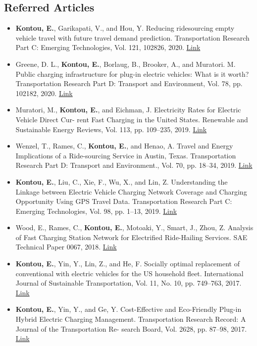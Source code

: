 \documentclass[margin,line]{resume}
\begin{document}
\begin{resume}
   \subsection{\mysidestyle \bf Referred Articles}
\begin{itemize}
\item {\bf Kontou, E.}, Garikapati, V., and Hou, Y. Reducing ridesourcing empty vehicle travel with future travel demand prediction. Transportation Research Part C: Emerging Technologies, Vol. 121, 102826, 2020. \href{https://doi.org/10.1016/j.trc.2020.102826}{Link}
\item Greene, D. L., {\bf Kontou, E.}, Borlaug, B., Brooker, A., and Muratori. M. Public charging infrastructure for plug-in electric vehicles: What is it worth? Transportation Research Part D: Transport and Environment, Vol. 78, pp. 102182, 2020. \href{https://doi.org/10.1016/j.trd. 2019.11.011}{Link}
\item Muratori, M., {\bf Kontou, E.}, and Eichman, J. Electricity Rates for Electric Vehicle Direct Cur- rent Fast Charging in the United States. Renewable and Sustainable Energy Reviews, Vol. 113, pp. 109–235, 2019. \href{https://doi.org/10.1016/j.rser.2019.06.042}{Link}
\item Wenzel, T., Rames, C., {\bf Kontou, E.}, and Henao, A. Travel and Energy Implications of a Ride-sourcing Service in Austin, Texas. Transportation Research Part D: Transport and Environment., Vol. 70, pp. 18–34, 2019. \href{https://doi.org/10.1016/j.trd.2019.03.005}{Link}
\item {\bf Kontou, E.}, Liu, C., Xie, F., Wu, X., and Lin, Z. Understanding the Linkage between Electric Vehicle Charging Network Coverage and Charging Opportunity Using GPS Travel Data. Transportation Research Part C: Emerging Technologies, Vol. 98, pp. 1–13, 2019. \href{https://doi.org/10.1016/j.trc.2018.11.008}{Link}
\item Wood, E., Rames, C., {\bf Kontou, E.}, Motoaki, Y., Smart, J., Zhou, Z. Analysis of Fast Charging Station Network for Electrified Ride-Hailing Services. SAE Technical Paper 0067, 2018. \href{https://doi.org/10.4271/2018-01-0667}{Link}
\item {\bf Kontou, E.}, Yin, Y., Lin, Z., and He, F. Socially optimal replacement of conventional with electric vehicles for the US household fleet. International Journal of Sustainable Transportation, Vol. 11, No. 10, pp. 749–763, 2017. \href{https://doi.org/10.1080/15568318.2017.1313341}{Link}
\item {\bf Kontou, E.}, Yin, Y., and Ge, Y. Cost-Effective and Eco-Friendly Plug-in Hybrid Electric Charging Management. Transportation Research Record: A Journal of the Transportation Re- search Board, Vol. 2628, pp. 87–98, 2017. \href{https://doi.org/10.3141/2628-10}{Link}

\end{itemize}
\end{resume}
\end{document}
